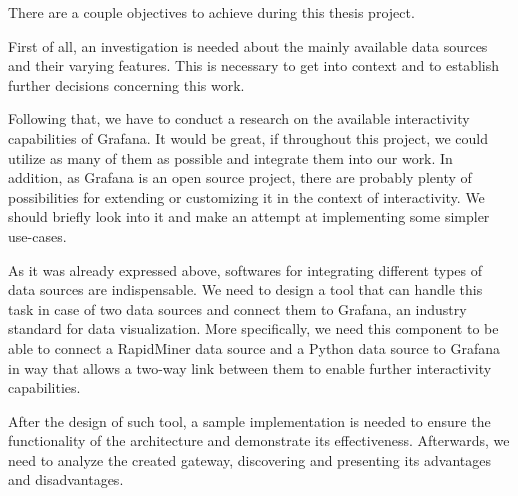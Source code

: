 

There are a couple objectives to achieve during this thesis project.

First of all, an investigation is needed about the mainly available data sources and their varying features. This is necessary to get into context and to establish further decisions concerning this work.

Following that, we have to conduct a research on the available interactivity capabilities of Grafana. It would be great, if throughout this project, we could utilize as many of them as possible and integrate them into our work. In addition, as Grafana is an open source project, there are probably plenty of possibilities for extending or customizing it in the context of interactivity. We should briefly look into it and make an attempt at implementing some simpler use-cases.

As it was already expressed above, softwares for integrating different types of data sources are indispensable. We need to design a tool that can handle this task in case of two data sources and connect them to Grafana, an industry standard for data visualization. More specifically, we need this component to be able to connect a RapidMiner data source and a Python data source to Grafana in way that allows a two-way link between them to enable further interactivity capabilities.

After the design of such tool, a sample implementation is needed to ensure the functionality of the architecture and demonstrate its effectiveness. Afterwards, we need to analyze the created gateway, discovering and presenting its advantages and disadvantages.







